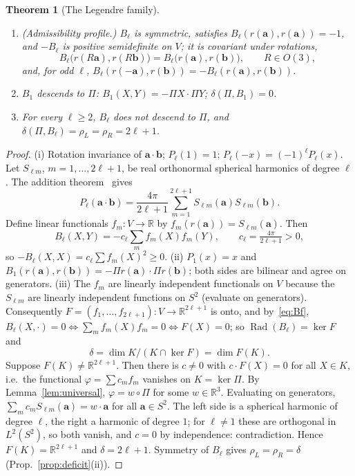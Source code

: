 \documentclass[11pt,a4paper]{article}
\newcommand{\RR}{\mathbb{R}}
\newcommand{\Rad}{\operatorname{Rad}}
\newcommand{\defic}{\delta}
\theoremstyle{plain}
\newtheorem{theorem}{Theorem}[section]
\theoremstyle{definition}
\begin{document}
\begin{theorem}[The Legendre family]\label{thm:legendre}
\begin{enumerate}[label=(\roman*)]
\item (Admissibility profile.) $B_\ell$ is symmetric, satisfies $B_\ell(r(\mathbf a),r(\mathbf a))=-1$, and $-B_\ell$ is positive semidefinite on $V$; it is covariant under rotations,
\[ B_\ell\bigl(r(R\mathbf a),r(R\mathbf b)\bigr)=B_\ell\bigl(r(\mathbf a),r(\mathbf b)\bigr),\qquad R\in O(3), \]
and, for odd $\ell$, $B_\ell(r(-\mathbf a),r(\mathbf b))=-B_\ell(r(\mathbf a),r(\mathbf b))$.
\item $B_1$ descends to $\Pi$: $B_1(X,Y)=-\Pi X\cdot\Pi Y$; $\defic(\Pi,B_1)=0$.
\item For every $\ell\ge2$, $B_\ell$ does not descend to $\Pi$, and $\defic(\Pi,B_\ell)=\rho_L=\rho_R=2\ell+1$.
\end{enumerate}
\end{theorem}
\begin{proof}
(i) Rotation invariance of $\mathbf a\cdot\mathbf b$; $P_\ell(1)=1$; $P_\ell(-x)=(-1)^\ell P_\ell(x)$. Let $S_{\ell m}$, $m=1,\dots,2\ell+1$, be real orthonormal spherical harmonics of degree $\ell$. The addition theorem~\cite{AAR99} gives
\begin{equation}\label{eq:addition}
P_\ell(\mathbf a\cdot\mathbf b)=\frac{4\pi}{2\ell+1}\sum_{m=1}^{2\ell+1}S_{\ell m}(\mathbf a)S_{\ell m}(\mathbf b).
\end{equation}
Define linear functionals $f_m\colon V\to\RR$ by $f_m(r(\mathbf a))=S_{\ell m}(\mathbf a)$. Then
\begin{equation}\label{eq:Bf}
B_\ell(X,Y)=-c_\ell\sum_m f_m(X)f_m(Y),\qquad c_\ell=\tfrac{4\pi}{2\ell+1}>0,
\end{equation}
so $-B_\ell(X,X)=c_\ell\sum f_m(X)^2\ge0$.
(ii) $P_1(x)=x$ and $B_1(r(\mathbf a),r(\mathbf b))=-\Pi r(\mathbf a)\cdot\Pi r(\mathbf b)$; both sides are bilinear and agree on generators.
(iii) The $f_m$ are linearly independent functionals on $V$ because the $S_{\ell m}$ are linearly independent functions on $S^2$ (evaluate on generators). Consequently $F=(f_1,\dots,f_{2\ell+1})\colon V\to\RR^{2\ell+1}$ is onto, and by~\eqref{eq:Bf}, $B_\ell(X,\cdot)=0\iff\sum_mf_m(X)f_m=0\iff F(X)=0$; so $\Rad(B_\ell)=\ker F$ and
\[ \defic=\dim K/(K\cap\ker F)=\dim F(K). \]
Suppose $F(K)\neq\RR^{2\ell+1}$. Then there is $c\neq0$ with $c\cdot F(X)=0$ for all $X\in K$, i.e.\ the functional $\varphi=\sum c_mf_m$ vanishes on $K=\ker\Pi$. By Lemma~\ref{lem:universal}, $\varphi=w\circ\Pi$ for some $w\in\RR^3$. Evaluating on generators, $\sum_mc_mS_{\ell m}(\mathbf a)=w\cdot\mathbf a$ for all $\mathbf a\in S^2$. The left side is a spherical harmonic of degree $\ell$, the right a harmonic of degree $1$; for $\ell\neq1$ these are orthogonal in $L^2(S^2)$, so both vanish, and $c=0$ by independence: contradiction. Hence $F(K)=\RR^{2\ell+1}$ and $\defic=2\ell+1$. Symmetry of $B_\ell$ gives $\rho_L=\rho_R=\defic$ (Prop.~\ref{prop:deficit}(ii)).
\end{proof}
\end{document}
